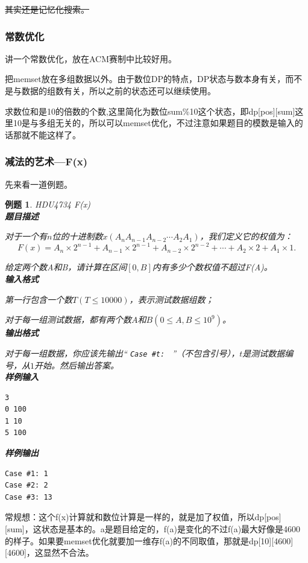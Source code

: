\documentclass{article}
\newtheorem{example}{例题}[subsection]
\theoremstyle{nonumberplain}
\begin{document}
	\sout{其实还是记忆化搜索。}
	\subsubsection{常数优化}
	讲一个常数优化，放在ACM赛制中比较好用。

	把memset放在多组数据以外。由于数位DP的特点，DP状态与数本身有关，而不是与数据的组数有关，所以之前的状态还可以继续使用。

	求数位和是10的倍数的个数,这里简化为数位sum\%10这个状态，即dp[pos][sum]这里10是与多组无关的，所以可以memset优化，不过注意如果题目的模数是输入的话那就不能这样了。
	\subsubsection{减法的艺术---F(x)}
	先来看一道例题。
	\begin{example} HDU4734 F(x)\\
	\textbf{题目描述}
	
	对于一个有$n$位的十进制数$x(A_nA_{n-1}A_{n-2}\cdots A_2A_1)$，我们定义它的权值为：
	\begin{equation*}
	F(x)=A_n\times 2^{n-1}+A_{n-1}\times 2^{n-1}+A_{n-2}\times 2^{n-2}+\cdots+A_2\times 2+A_1\times 1.
	\end{equation*}
	
给定两个数A和B，请计算在区间$[0,B]$内有多少个数权值不超过F(A)。\\
	\textbf{输入格式}
	
	第一行包含一个数$T(T\leq 10000)$，表示测试数据组数；
	
	对于每一组测试数据，都有两个数$A$和$B(0\leq A, B\leq 10^9)$。\\
	\textbf{输出格式}
	
	对于每一组数据，你应该先输出`` \verb+Case #t: + ''（不包含引号），$t$是测试数据编号，从$1$开始。然后输出答案。\\
	\textbf{样例输入}
\begin{verbatim}
3
0 100
1 10
5 100
\end{verbatim}
\textbf{样例输出}
\begin{verbatim}
Case #1: 1
Case #2: 2
Case #3: 13
\end{verbatim}
	\end{example}

常规想：这个f(x)计算就和数位计算是一样的，就是加了权值，所以dp[pos][sum]，这状态是基本的。a是题目给定的，f(a)是变化的不过f(a)最大好像是4600的样子。如果要memset优化就要加一维存f(a)的不同取值，那就是dp[10][4600][4600]，这显然不合法。
\end{document}
